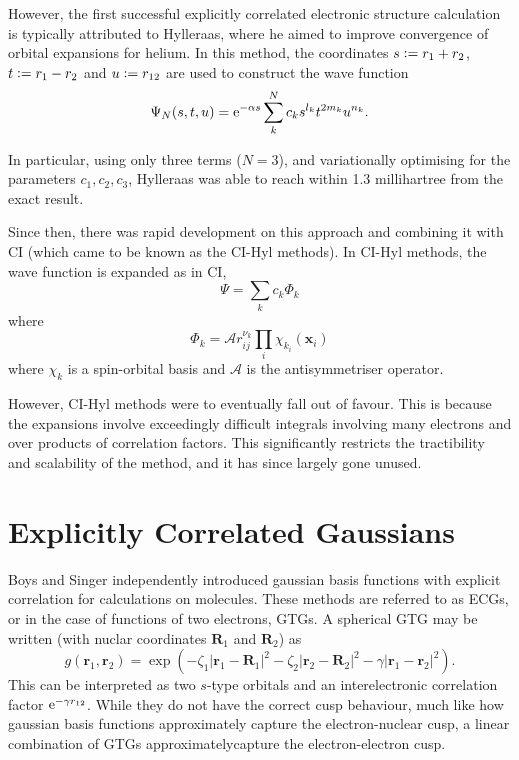 However, the first successful explicitly correlated electronic structure calculation is typically attributed to Hylleraas,\cite{hattigExplicitly2011} where he aimed to improve convergence of orbital expansions for helium.\cite{hylleraasUeber1928,hylleraasNeue1929} In this method, the coordinates $s\mathrel{\mathop:}= r_1+r_2$, $t\mathrel{\mathop:}= r_1 - r_2$ and $u\mathrel{\mathop:}= r_{12}$ are used to construct the wave function
\begin{equation}
    \Psi_N(s,t,u) = \mathrm{e}^{-\alpha s}\sum_{k}^N c_ks^{l_k}t^{2m_k}u^{n_k}.
\end{equation}

In particular, using only three terms ($N=3$), and variationally optimising for the parameters $c_1,c_2,c_3$, Hylleraas was able to reach within 1.3 millihartree from the exact result.

Since then, there was rapid development on this approach and combining it with \gls{CI} (which came to be known as the CI-Hyl methods).
\cite{largo-cabrerizoHylleraasCI1987,jamesGround1933,kolosAccurate1964,perkinsAtomic1968,perkinsAtomic1969,simsCombined1971,simsOneCenter1971,claryHylleraastype1977,claryCIHylleraas1976} In CI-Hyl methods, the wave function is expanded as in \gls{CI},
\begin{equation}
    \Psi = \sum_k c_k \Phi_k
\end{equation}
where
\begin{equation}
    \Phi_k = \mathcal{A} r^{\nu_k}_{ij}\prod_i\chi_{k_i}(\bm x_i)
\end{equation}
where ${\chi_k}$ is a spin-orbital basis and $\mathcal{A}$ is the antisymmetriser operator.

However, CI-Hyl methods were to eventually fall out of favour. This is because the expansions involve exceedingly difficult integrals involving many electrons and over products of correlation factors. This significantly restricts the tractibility and scalability of the method, and it has since largely gone unused.

\section{Explicitly Correlated Gaussians}

Boys\cite{boysIntegral1960} and Singer\cite{singerUse1960} independently introduced gaussian basis functions with explicit correlation for calculations on molecules.\cite{mitroyTheory2013} These methods are referred to as \glspl{ECG}, or in the case of functions of two electrons, \glspl{GTG}. A spherical \gls{GTG} may be written (with nuclar coordinates $\bm R_1$ and $\bm R_2$) as
\begin{equation}
    g(\bm r_1, \bm r_2) = \exp(-\zeta_1|\bm r_1 - \bm R_1|^2 - \zeta_2|\bm r_2 - \bm R_2|^2 - \gamma|\bm r_1 - \bm r_2|^2).
\end{equation}
This can be interpreted as two $s$-type orbitals and an interelectronic correlation factor $\mathrm{e}^{-\gamma r_{12}}$.
While they do not have the correct cusp behaviour, much like how gaussian basis functions approximately capture the electron-nuclear cusp, a linear combination of \glspl{GTG} approximatelycapture the electron-electron cusp.

